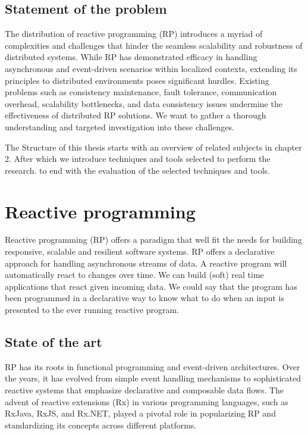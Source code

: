 \documentclass[a4paper]{book}
\begin{document}
\section{Statement of the problem}
The distribution of reactive programming (RP) introduces a myriad of complexities and challenges that hinder the seamless scalability and robustness of distributed systems. While RP has demonstrated efficacy in handling asynchronous and event-driven scenarios within localized contexts, extending its principles to distributed environments poses significant hurdles. Existing problems such as consistency maintenance, fault tolerance, communication overhead, scalability bottlenecks, and data consistency issues undermine the effectiveness of distributed RP solutions. We want to gather a thorough understanding and targeted investigation into these challenges.

The Structure of this thesis starts with an overview of related subjects in chapter 2. After which we introduce techniques and tools selected to perform the research. to end with the evaluation of the selected techniques and tools.

\chapter{Reactive programming}

Reactive programming (RP) offers a paradigm that well fit the needs for building responsive, scalable and resilient software systems. RP offers a declarative approach for handling asynchronous streams of data. A reactive program will automatically react to changes over time. We can build (soft) real time applications that react given incoming data. We could say that the program has been programmed in a declarative way to know what to do when an input is presented to the ever running reactive program. 

\section{State of the art}
RP has its roots in functional programming and event-driven architectures. Over the years, it has evolved from simple event handling mechanisms to sophisticated reactive systems that emphasize declarative and composable data flows. The advent of reactive extensions (Rx) in various programming languages, such as RxJava, RxJS, and Rx.NET, played a pivotal role in popularizing RP and standardizing its concepts across different platforms.
\end{document}
